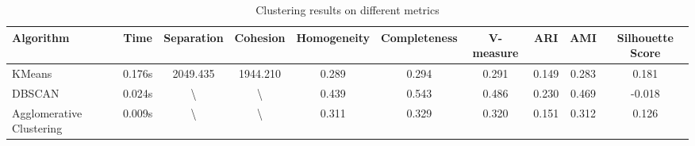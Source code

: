 \documentclass[12pt,a4paper]{article}
\begin{document}
\begin{table}[H]
\begin{adjustbox}{width=\textwidth}
    \centering
    \begin{tabular}{lccccccccc}
        \toprule
        \textbf{Algorithm} & \textbf{Time} & \textbf{Separation} & \textbf{Cohesion} & \textbf{Homogeneity} & \textbf{Completeness} & \textbf{V-measure} & \textbf{ARI} & \textbf{AMI} & \textbf{Silhouette Score} \\
        \midrule
        KMeans & 0.176s & 2049.435 & 1944.210 & 0.289 & 0.294 & 0.291 & 0.149 & 0.283 & 0.181 \\
        DBSCAN & 0.024s & \textbackslash & \textbackslash & 0.439 & 0.543 & 0.486 & 0.230 & 0.469 & -0.018 \\
        Agglomerative Clustering & 0.009s & \textbackslash & \textbackslash & 0.311 & 0.329 & 0.320 & 0.151 & 0.312 & 0.126 \\
        \bottomrule
    \end{tabular}
\end{adjustbox}
    \caption{Clustering results on different metrics}
    \label{tab:clustering_results}
\end{table}
\end{document}

